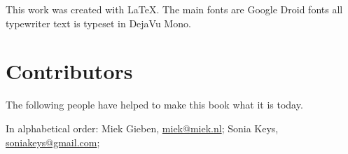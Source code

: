 This work was created with \LaTeX. The main fonts are Google Droid fonts all
typewriter text is typeset in DejaVu Mono.

\section{Contributors}
The following people have helped to make this book what it is today.

In alphabetical order:
\noindent
Miek Gieben, \url{miek@miek.nl};
Sonia Keys, \url{soniakeys@gmail.com}; 
